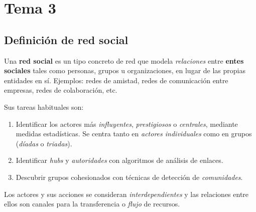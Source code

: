 \documentclass[10pt,spanish, landscape, twocolumn]{article}
\begin{document}
\newpage
\section{\textcolor{tematres}{Tema 3}}
\subsection{\textcolor{tematres}Definición de red social}
Una \textbf{\textcolor{tematres}{red social}} es un tipo concreto de red que modela \textit{\textcolor{tematres}{relaciones}} entre \textbf{\textcolor{tematres}{entes sociales}} tales como personas, grupos u organizaciones, en lugar de las propias entidades en sí. Ejemplos: redes de amistad, redes de comunicación entre empresas, redes de colaboración, etc.

Sus tareas habituales son:

\begin{enumerate}[\color{tematres}{$\bullet$}]
    \item Identificar los actores más \textit{\textcolor{tematres}{influyentes}}, \textit{\textcolor{tematres}{prestigiosos}} o \textit{\textcolor{tematres}{centrales}}, mediante medidas estadísticas. Se centra tanto en \textit{\textcolor{tematres}{actores individuales}} como en grupos (\textit{\textcolor{tematres}{díadas}} o \textit{\textcolor{tematres}{triadas}}).
    \item Identificar \textit{\textcolor{tematres}{hubs}} y \textit{\textcolor{tematres}{autoridades}} con algoritmos de análisis de enlaces.
    \item Descubrir grupos cohesionados con técnicas de detección de \textit{\textcolor{tematres}{comunidades}}.
\end{enumerate}

Los actores y sus acciones se consideran \textit{\textcolor{tematres}{interdependientes}} y las relaciones entre ellos son canales para la transferencia o \textit{\textcolor{tematres}{flujo}} de recursos.
\end{document}
